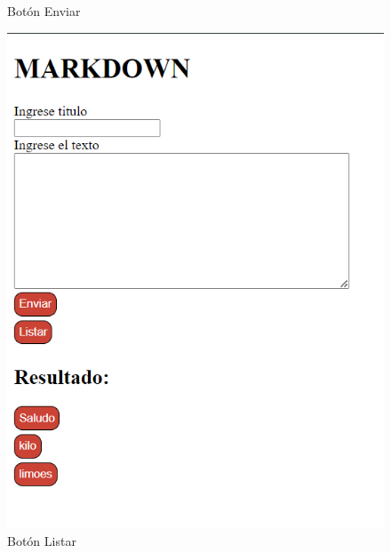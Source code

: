 \documentclass{article}
\begin{document}
\begin{itemize}
\begin{figure}[H]
			\caption{Botón Enviar}
		\end{figure}
		\begin{figure}[H]
			\centering
			\includegraphics[width=1\textwidth,keepaspectratio]{img/web3.png}
			\caption{Botón Listar}
		\end{figure}
		\begin{figure}[H]
			\centering

\end{figure}
\end{itemize}
\end{document}
